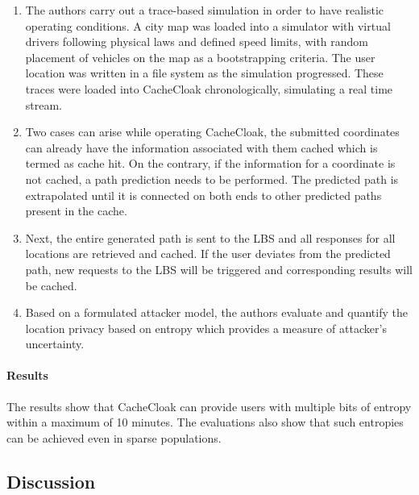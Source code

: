 \begin{enumerate}
	\item The authors carry out a trace-based simulation in order to have realistic operating
	 conditions. A city map was loaded into a simulator with virtual drivers following physical laws
	 and defined speed limits, with random placement of vehicles on the map as a bootstrapping
	 criteria. The user location was written in a file system as the simulation progressed. These
	 traces were loaded into CacheCloak chronologically, simulating a real time stream.
	 
	 \item Two cases can arise while operating CacheCloak, the submitted coordinates can already
	 have the information associated with them cached which is termed as cache hit. On the contrary, 
	 if the information for a coordinate is not cached, a path prediction needs to be performed. The
	 predicted path is extrapolated until it is connected on both ends to other predicted paths 
	 present in the cache. 
	 
	 \item Next, the entire generated path is sent to the LBS and all responses for all locations
	 are retrieved and cached. If the user deviates from the predicted path, new requests to the 
	 LBS will be triggered and corresponding results will be cached. 
	 
	 \item Based on a formulated attacker model, the authors evaluate and quantify the location 
	 privacy based on entropy which provides a measure of attacker's uncertainty. 
	
	
\end{enumerate}

\paragraph{Results}

The results show that CacheCloak can provide users with multiple bits
of entropy within a maximum of 10 minutes. The evaluations also show that
such entropies can be achieved even in sparse populations. 

\subsection{Discussion} 

